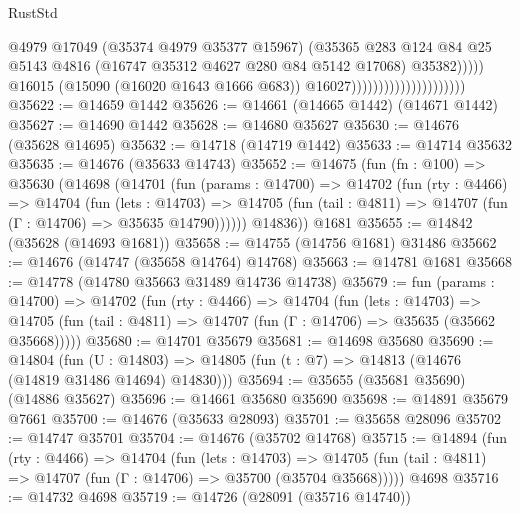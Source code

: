 \begin{lexlean}{RustStd}
\begin{coremodule}
                                                      @4979
                                                      @17049
                                                      (@35374 @4979 @35377 @15967)
                                                      (@35365
                                                        @283
                                                        @124
                                                        @84
                                                        @25
                                                        @5143
                                                        @4816
                                                        (@16747 @35312 @4627 @280 @84 @5142 @17068)
                                                        @35382)))))
                                              @16015
                                              (@15090 (@16020 @1643 @1666 @683))
                                              @16027)))))))))))))))))))))
@35622 := @14659 @1442
@35626 := @14661 (@14665 @1442) (@14671 @1442)
@35627 := @14690 @1442
@35628 := @14680 @35627
@35630 := @14676 (@35628 @14695)
@35632 := @14718 (@14719 @1442)
@35633 := @14714 @35632
@35635 := @14676 (@35633 @14743)
@35652 := @14675
    (fun (fn : @100) =>
    @35630
      (@14698
        (@14701
          (fun (params : @14700) =>
          @14702
            (fun (rty : @4466) =>
            @14704
              (fun (lets : @14703) =>
              @14705 (fun (tail : @4811) => @14707 (fun (Γ : @14706) => @35635 @14790))))))
        @14836))
    @1681
@35655 := @14842 (@35628 (@14693 @1681))
@35658 := @14755 (@14756 @1681) @31486
@35662 := @14676 (@14747 (@35658 @14764) @14768)
@35663 := @14781 @1681
@35668 := @14778 (@14780 @35663 @31489 @14736 @14738)
@35679 := fun (params : @14700) =>
  @14702
    (fun (rty : @4466) =>
    @14704
      (fun (lets : @14703) =>
      @14705 (fun (tail : @4811) => @14707 (fun (Γ : @14706) => @35635 (@35662 @35668)))))
@35680 := @14701 @35679
@35681 := @14698 @35680
@35690 := @14804
    (fun (U : @14803) => @14805 (fun (t : @7) => @14813 (@14676 (@14819 @31486 @14694) @14830)))
@35694 := @35655 (@35681 @35690) (@14886 @35627)
@35696 := @14661 @35680 @35690
@35698 := @14891 @35679 @7661
@35700 := @14676 (@35633 @28093)
@35701 := @35658 @28096
@35702 := @14747 @35701
@35704 := @14676 (@35702 @14768)
@35715 := @14894
    (fun (rty : @4466) =>
    @14704
      (fun (lets : @14703) =>
      @14705 (fun (tail : @4811) => @14707 (fun (Γ : @14706) => @35700 (@35704 @35668)))))
    @4698
@35716 := @14732 @4698
@35719 := @14726 (@28091 (@35716 @14740))

\end{coremodule}
\end{lexlean}

